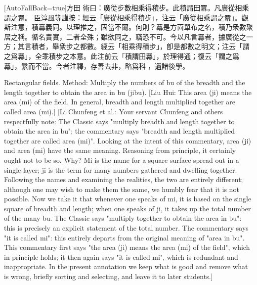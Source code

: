 \documentclass[11pt]{article}
\newcommand{\zhsmall}{\footnotesize\color{black!70}}
\newcommand{\unitlabel}[1]{\marginpar{\raggedleft\tiny\color{gray}#1}}
\newenvironment{unitzh}{\par\CJKfontspec{Noto Serif CJK SC}[AutoFallBack=true]\large\linespread{1.25}\selectfont}{\par}
\newenvironment{uniten}{\par\small\color{black!85}}{\par\medskip}
\begin{document}
\begin{unitzh}\unitlabel{jiuzhang-003.5}方田 術曰：廣從步數相乘得積步。{\zhsmall 此積謂田羃。凡廣從相乘謂之羃。 臣淳風等謹按：經云「廣從相乘得積步」，注云「廣從相乘謂之羃」。觀斯注意，積羃義同。以理推之，固當不爾。何則？羃是方靣單布之名，積乃衆數聚居之稱。循名責實，二者全殊；雖欲同之，竊恐不可。今以凡言羃者，據廣從之一方；其言積者，舉衆步之都數。經云「相乘得積步」，卽是都數之明文；注云「謂之爲羃」，全乖積步之本意。此注前云「積謂田羃」，於理得通；復云「謂之爲羃」，䌓而不當。今者注釋，存善去非，略爲科𥳑，遺諸後學。}\end{unitzh}
\begin{uniten}Rectangular fields. Method: Multiply the numbers of bu of the breadth and the length together to obtain the area in bu (jibu). [Liu Hui: This area (ji) means the area (mi) of the field. In general, breadth and length multiplied together are called area (mi).] [Li Chunfeng et al.: Your servant Chunfeng and others respectfully note: The Classic says "multiply breadth and length together to obtain the area in bu"; the commentary says "breadth and length multiplied together are called area (mi)". Looking at the intent of this commentary, area (ji) and area (mi) have the same meaning. Reasoning from principle, it certainly ought not to be so. Why? Mi is the name for a square surface spread out in a single layer; ji is the term for many numbers gathered and dwelling together. Following the names and examining the realities, the two are entirely different; although one may wish to make them the same, we humbly fear that it is not possible. Now we take it that whenever one speaks of mi, it is based on the single square of breadth and length; when one speaks of ji, it takes up the total number of the many bu. The Classic says "multiply together to obtain the area in bu": this is precisely an explicit statement of the total number. The commentary says "it is called mi": this entirely departs from the original meaning of "area in bu". This commentary first says "the area (ji) means the area (mi) of the field", which in principle holds; it then again says "it is called mi", which is redundant and inappropriate. In the present annotation we keep what is good and remove what is wrong, briefly sorting and selecting, and leave it to later students.]\end{uniten}
\end{document}
